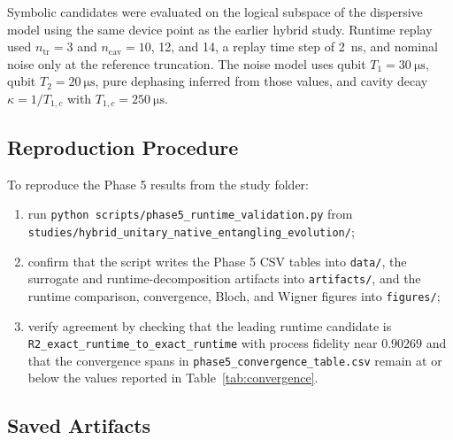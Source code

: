 \documentclass[aps,pra,twocolumn,reprint,amsmath,amssymb]{revtex4-2}
\begin{document}
Symbolic candidates were evaluated on the logical subspace of the dispersive
model using the same device point as the earlier hybrid study. Runtime replay
used $n_{\mathrm{tr}} = 3$ and $n_{\mathrm{cav}} = 10$, 12, and 14, a replay time
step of \SI{2}{ns}, and nominal noise only at the reference truncation. The
noise model uses qubit $T_1 = \SI{30}{\micro\second}$, qubit
$T_2 = \SI{20}{\micro\second}$, pure dephasing inferred from those values, and
cavity decay $\kappa = 1/T_{1,c}$ with $T_{1,c} = \SI{250}{\micro\second}$.

\subsection{Reproduction Procedure}

To reproduce the Phase 5 results from the study folder:
\begin{enumerate}
  \item run \texttt{python scripts/phase5\_runtime\_validation.py} from
  \texttt{studies/hybrid\_unitary\_native\_entangling\_evolution/};
  \item confirm that the script writes the Phase 5 CSV tables into
  \texttt{data/}, the surrogate and runtime-decomposition artifacts into
  \texttt{artifacts/}, and the runtime comparison, convergence, Bloch, and
  Wigner figures into \texttt{figures/};
  \item verify agreement by checking that the leading runtime candidate is
  \texttt{R2\_exact\_runtime\_to\_exact\_runtime} with process fidelity near
  $0.90269$ and that the convergence spans in
  \texttt{phase5\_convergence\_table.csv} remain at or below the values reported
  in Table~\ref{tab:convergence}.
\end{enumerate}

\subsection{Saved Artifacts}
\end{document}
